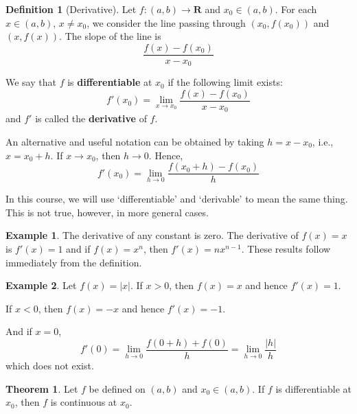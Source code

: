 \documentclass[12pt,a4paper]{article}
\theoremstyle{definition}
\newtheorem{theorem}{Theorem}[section]
\newtheorem{example}{Example}[section]
\newtheorem{definition}{Definition}[section]
\begin{document}
\begin{definition}[Derivative]
	Let $f : (a,b) \longrightarrow \textbf{R}$ and $x_0 \in (a,b)$. For each $x \in (a,b)$, $x \neq x_0$, we consider the line passing through $(x_0, f(x_0))$ and $(x, f(x))$. The slope of the line is
	\[
		\frac{f(x) - f(x_0)}{x - x_0}
	\]

	We say that $f$ is \textbf{differentiable} at $x_0$ if the following limit exists:
	\[
		f'(x_0)	 = \lim_{x \to x_0} \frac{f(x) - f(x_0)}{x - x_0}
	\]
	and $f'$ is called the \textbf{derivative} of $f$.
\end{definition}

An alternative and useful notation can be obtained by taking $h = x - x_0$, i.e., $x = x_0 + h$. If $x \to x_0$, then $h \to 0$. Hence,
\[
	f'(x_0) = \lim_{h \to 0} \frac{f(x_0 + h) - f(x_0)}{h}
\]

In this course, we will use `differentiable' and `derivable' to mean the same thing. This is not true, however, in more general cases.

\begin{example}
	The derivative of any constant is zero. The derivative of $f(x) = x$ is $f'(x) = 1$ and if $f(x) = x^n$, then $f'(x) = n x^{n-1}$. These results follow immediately from the definition.
\end{example}

\begin{example}
	Let $f(x) = |x|$. If $x > 0$, then $f(x) = x$ and hence $f'(x) = 1$.

	If $x<0$, then $f(x) = -x$ and hence $f'(x) = -1$.

	And if $x=0$,
	\[
		f'(0) = \lim_{h \to 0} \frac{f(0+h) + f(0)}{h} = \lim_{h \to 0} \frac{|h|}{h}
	\]
	which does not exist.
\end{example}

\begin{theorem}
	Let $f$ be defined on $(a,b)$ and $x_0 \in (a,b)$. If $f$ is differentiable at $x_0$, then $f$ is continuous at $x_0$.
\end{theorem}
\end{document}
